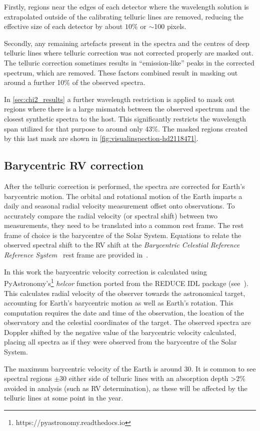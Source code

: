 Firstly, regions near the edges of each detector where the wavelength solution is extrapolated outside of the calibrating telluric lines are removed, reducing the effective size of each detector by about \(10\%\) or \(\sim\)100 pixels.

Secondly, any remaining artefacts present in the spectra and the centres of deep telluric lines where telluric correction was not corrected properly are masked out.
The telluric correction sometimes results in ``emission-like'' peaks in the corrected spectrum, which are removed.
These factors combined result in masking out around a further 10\% of the observed spectra.

In \cref{sec:chi2_results} a further wavelength restriction is applied to mask out regions where there is a large mismatch between the observed spectrum and the closest synthetic spectra to the host.
This significantly restricts the wavelength span utilized for that purpose to around only 43\%.
The masked regions created by this last mask are shown in \cref{fig:visualinspection-hd2118471}.


\subsection{Barycentric {RV} correction}
\label{subsec:barycentriccorrection}
After the telluric correction is performed, the spectra are corrected for Earth's barycentric motion.
The orbital and rotational motion of the Earth imparts a daily and seasonal radial velocity measurement offset onto observations.
To accurately compare the radial velocity (or spectral shift) between two measurements, they need to be translated into a common rest frame.
The rest frame of choice is the barycentre of the Solar System.
Equations to relate the observed spectral shift to the {RV} shift at the \textit{Barycentric Celestial Reference Reference System}~\citep{rickman_transactions_2001} rest frame are provided in~\citet{lindegren_fundamental_2003}.

In this work the barycentric velocity correction is calculated using PyAstronomy's\footnote{https://pyastronomy.readthedocs.io} \emph{helcor} function ported from the REDUCE IDL package (see~\citet[][]{piskunov_new_2002}).
This calculates radial velocity of the observer towards the astronomical target, accounting for Earth's barycentric motion as well as Earth's rotation.
This computation requires the date and time of the observation, the location of the observatory and the celestial coordinates of the target.
The observed spectra are Doppler shifted by the negative value of the barycentric velocity calculated, placing all spectra as if they were observed from the barycentre of the Solar System.

The maximum barycentric velocity of the Earth is around 30\kmps{}.
It is common to see spectral regions $\pm30$\kmps{} either side of telluric lines with an absorption depth >2\% avoided in analysis (such as {RV} determination), as these will be affected by the telluric lines at some point in the year.

